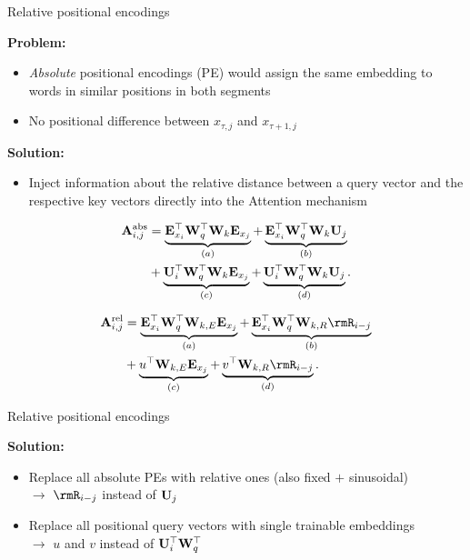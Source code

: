 
\begin{vbframe}{Relative positional encodings}

\vfill

\textbf{Problem:}

\begin{itemize}
	\item \textit{Absolute} positional encodings (PE) would assign the same embedding to words in similar positions in both segments
	\item No positional difference between $x_{\tau,j}$ and $x_{\tau+1,j}$
\end{itemize}

\textbf{Solution:}

\begin{itemize}
	\item Inject information about the relative distance between a query vector and the respective key vectors directly into the Attention mechanism
\end{itemize}

\begin{align*}
	\rmA_{i,j}^\text{abs} 
	&= \underbrace{ \rmE_{x_i}^\top \rmW_q^\top \rmW_k \rmE_{x_j} }_{(a)}
	+ \underbrace{\rmE_{x_i}^\top \rmW_q^\top \rmW_k \rmU_{j}}_{(b)} \\
	&+ \underbrace{\rmU_{i}^\top \rmW_q^\top \rmW_k \rmE_{x_j}}_{(c)}
	+ \underbrace{\rmU_{i}^\top \rmW_q^\top \rmW_k \rmU_{j}}_{(d)}. \vspace{-0.5em}
\end{align*}

\begin{align*}
	\rmA_{i,j}^\text{rel}
	&= \underbrace{ \rmE_{x_i}^\top \rmW_q^\top \rmW_{k,E} \rmE_{x_j} }_{(a)}
	+ \underbrace{\rmE_{x_i}^\top \rmW_q^\top \rmW_{k,R} \rmR_{i-j} }_{(b)} \\
	&+ \underbrace{u^\top \rmW_{k,E} \rmE_{x_j}}_{(c)}
	+ \underbrace{v^\top \rmW_{k,R} \rmR_{i-j}}_{(d)}.
\end{align*}

\end{vbframe}


\begin{vbframe}{Relative positional encodings}

\vfill

\textbf{Solution:}

\begin{itemize}
	\item Replace all absolute PEs with relative ones (also fixed $+$ sinusoidal)\\
				$\to$ $\rmR_{i-j}$ instead of ${\mathbf{U}}_{j}$
	\item Replace all positional query vectors with single trainable embeddings\\
				$\to$ $u$ and $v$ instead of ${\mathbf{U}}_{i}^\top {\mathbf{W}}_q^\top$
\end{itemize}

\vfill

\end{vbframe}


\endlecture

